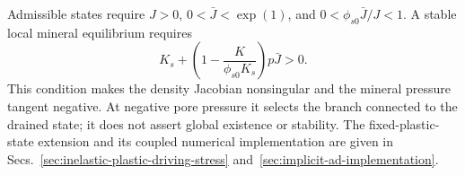 Admissible states require \(J>0\), \(0<\bar J<\exp(1)\), and
\(0<\phi_{s0}\bar J/J<1\).  A stable local mineral equilibrium requires
\begin{equation}
 K_s+\left(1-\frac{K}{\phi_{s0}K_s}\right)p\bar J>0.
 \label{eq:trace-mineral-stability-domain}
\end{equation}
This condition makes the density Jacobian nonsingular and the mineral
pressure tangent negative.  At negative pore pressure it selects the branch
connected to the drained state; it does not assert global existence or
stability.  The fixed-plastic-state extension and its coupled numerical
implementation are given in Secs.~\ref{sec:inelastic-plastic-driving-stress}
and~\ref{sec:implicit-ad-implementation}.
